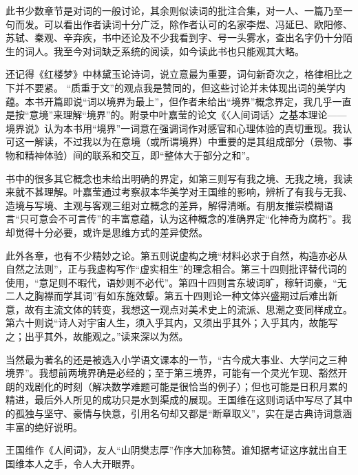 \par 此书少数章节是对词的一般讨论，其余则似读词的批注合集，对一人、一篇乃至一句而发。可以看出作者读词十分广泛，除作者认可的名家李煜、冯延巳、欧阳修、苏轼、秦观、辛弃疾，书中还论及不少我看到字、号一头雾水，查出名字仍十分陌生的词人。我至今对词缺乏系统的阅读，如今读此书也只能观其大略。
\par 还记得《红楼梦》中林黛玉论诗词，说立意最为重要，词句新奇次之，格律相比之下并不要紧。 “质重于文”的观点我是赞同的，但这些讨论并未体现出词的美学内蕴。本书开篇即说“词以境界为最上”，但作者未给出“境界”概念界定，我几乎一直是按“意境”来理解“境界”的。附录中叶嘉莹的论文《〈人间词话〉之基本理论——境界说》认为本书用“境界”一词意在强调词作对感官和心理体验的真切重现。我认可这一解读，不过我以为在意境（或所谓境界）中重要的是其组成部分（景物、事物和精神体验）间的联系和交互，即“整体大于部分之和”。
\par 书中的很多其它概念也未给出明确的界定，如第三则写有我之境、无我之境，我读来就不甚理解。叶嘉莹通过考察叔本华美学对王国维的影响，辨析了有我与无我、造境与写境、主观与客观三组对立概念的差异，解得清晰。有朋友推崇模糊语言“只可意会不可言传”的丰富意蕴，认为这种概念的准确界定“化神奇为腐朽”。我却觉得十分必要，或许是思维方式的差异使然。
\par 此外各章，也有不少精妙之论。第五则说虚构之境“材料必求于自然，构造亦必从自然之法则”，正与我虚构写作“虚实相生”的理念相合。第三十四则批评替代词的使用，“意足则不暇代，语妙则不必代”。第四十四则言东坡词旷，稼轩词豪，“无二人之胸襟而学其词”有如东施效颦。第五十四则论一种文体兴盛期过后难出新意，故有主流文体的转变，我想这一观点对美术史上的流派、思潮之变同样成立。第六十则说“诗人对宇宙人生，须入乎其内，又须出乎其外；入乎其内，故能写之；出乎其外，故能观之。”读来深以为然。
\par 当然最为著名的还是被选入小学语文课本的一节，“古今成大事业、大学问之三种境界”。我想前两境界确是必经的；至于第三境界，可能有一个灵光乍现、豁然开朗的戏剧化的时刻（解决数学难题可能是很恰当的例子）；但也可能是日积月累的精进，最后外人所见的成功只是水到渠成的展现。王国维在这则词话中写尽了其中的孤独与坚守、豪情与快意，引用名句却又都是“断章取义”，实在是古典诗词意涵丰富的绝好说明。
\par 王国维作《人间词》，友人“山阴樊志厚”作序大加称赞。谁知据考证这序就出自王国维本人之手，令人大开眼界。
\par {}
